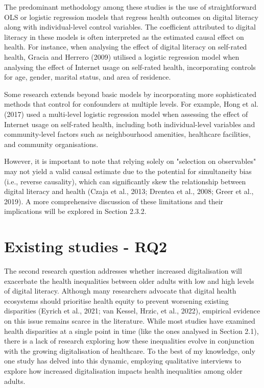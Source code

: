 The predominant methodology among these studies is the use of straightforward OLS or logistic regression models that regress health outcomes on digital literacy along with individual-level control variables. The coefficient attributed to digital literacy in these models is often interpreted as the estimated causal effect on health. For instance, when analysing the effect of digital literacy on self-rated health, Gracia and Herrero (2009) utilised a logistic regression model when analysing the effect of Internet usage on self-rated health, incorporating controls for age, gender, marital status, and area of residence. 

Some research extends beyond basic models by incorporating more sophisticated methods that control for confounders at multiple levels. For example, Hong et al. (2017) used a multi-level logistic regression model when assessing the effect of Internet usage on self-rated health, including both individual-level variables and community-level factors such as neighbourhood amenities, healthcare facilities, and community organisations. 

However, it is important to note that relying solely on "selection on observables" may not yield a valid causal estimate due to the potential for simultaneity bias (i.e., reverse causality), which can significantly skew the relationship between digital literacy and health (Czaja et al., 2013; Drentea et al., 2008; Greer et al., 2019). A more comprehensive discussion of these limitations and their implications will be explored in Section 2.3.2.


\section{Existing studies - RQ2}
The second research question addresses whether increased digitalisation will exacerbate the health inequalities between older adults with low and high levels of digital literacy. Although many researchers advocate that digital health ecosystems should prioritise health equity to prevent worsening existing disparities (Eyrich et al., 2021; van Kessel, Hrzic, et al., 2022), empirical evidence on this issue remains scarce in the literature. While most studies have examined health disparities at a single point in time (like the ones analysed in Section 2.1), there is a lack of research exploring how these inequalities evolve in conjunction with the growing digitalisation of healthcare. To the best of my knowledge, only one study has delved into this dynamic, employing qualitative interviews to explore how increased digitalisation impacts health inequalities among older adults.

